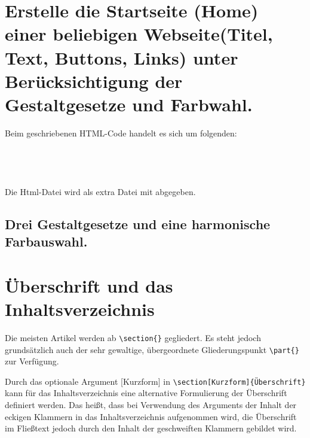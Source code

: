 \documentclass[a4paper,%
twoside,							%
headsepline = true,				%
footsepline = true,				%
headings=normal,
listof = totoc,					%
bibliography = totoc,		%
listof = entryprefix,		%
]
{scrartcl}
\begin{document}
\section{Erstelle die Startseite (Home) einer beliebigen Webseite(Titel, Text, Buttons, Links) unter Berücksichtigung der Gestaltgesetze und Farbwahl.}
\label{sec:AufgabeEins}
Beim geschriebenen HTML-Code handelt es sich um folgenden:
\cite{Hönemann2019:Bewegungswahrnehmung}
\cite[vgl.][2]{Hönemann2019:Farbwahrnehmung} \\
\cites[vgl.][2]{Hönemann2019:Farbwahrnehmung}[10]{Hönemann2019:Bewegungswahrnehmung}[30-40]{Schultz:Gestaltgesetze} \\
\cite{Hönemann2019:Bewegungswahrnehmung} \\
\cite{Schultz:Gestaltgesetze}\\
\cite{GoldsteinE.Bruce2015W:dG}\\
Die Html-Datei wird als extra Datei mit abgegeben.


\subsection{Drei Gestaltgesetze und eine harmonische Farbauswahl.}
\label{sec:AufgabeEinsA}

\section[Überschriften]{Überschrift und das Inhaltsverzeichnis}
Die meisten Artikel werden ab \verb#\section{}# gegliedert. Es steht jedoch grundsätzlich auch der sehr gewaltige, übergeordnete Gliederungspunkt \verb#\part{}# zur Verfügung.

Durch das optionale Argument [Kurzform] in \verb#\section[Kurzform]{Überschrift}# kann für das Inhaltsverzeichnis eine alternative Formulierung der Überschrift definiert werden. Das heißt, dass bei Verwendung des Arguments der Inhalt der eckigen Klammern in das Inhaltsverzeichnis aufgenommen wird, die Überschrift im Fließtext jedoch durch den Inhalt der geschweiften Klammern gebildet wird. 
\end{document}
